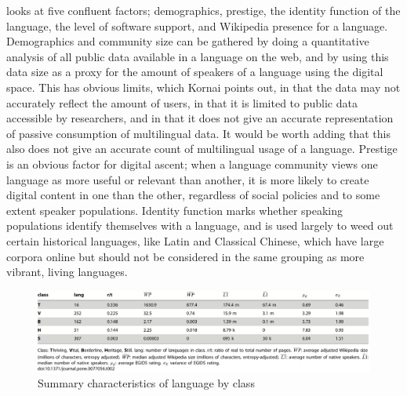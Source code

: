 \citet{kornai2013digital} looks at five confluent factors; demographics, prestige, the identity function of the language, the level of software support, and Wikipedia presence for a language. Demographics and community size can be gathered by doing a quantitative analysis of all public data available in a language on the web, and by using this data size as a proxy for the amount of speakers of a language using the digital space. This has obvious limits, which Kornai points out, in that the data may not accurately reflect the amount of users, in that it is limited to public data accessible by researchers, and in that it does not give an accurate representation of passive consumption of multilingual data. It would be worth adding that this also does not give an accurate count of multilingual usage of a language. Prestige is an obvious factor for digital ascent; when a language community views one language as more useful or relevant than another, it is more likely to create digital content in one than the other, regardless of social policies and to some extent speaker populations. Identity function marks whether speaking populations identify themselves with a language, and is used largely to weed out certain historical languages, like Latin and Classical Chinese, which have large corpora online but should not be considered in the same grouping as more vibrant, living languages.

\begin{figure}
 \centering
 \includegraphics[width=1\textwidth]{img/kornai.png}
 \caption{Summary characteristics of language by class \citep[9]{kornai2013digital}}
 \label{fig:kornai}
\end{figure}

